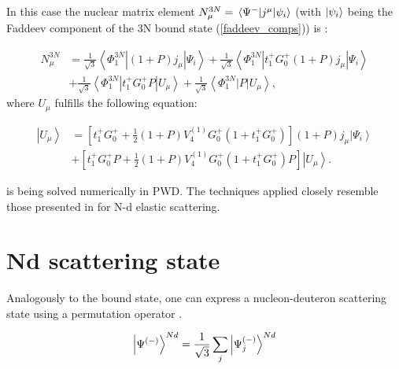     In this case the nuclear matrix element 
    $N_\mu^{3 N} = \matrixel{\Psi^-}{j^\mu}{\psi_i}$ 
    (with $\ket{\psi_i}$ being the Faddeev component of the 3N bound state (\ref{faddeev_comps})) is
    \cite{GLOCKLE_report_1996, skibinski_prc_2003} :

    \begin{equation}
        \begin{aligned}
            N_\mu^{3 N} & =\frac{1}{\sqrt{3}}\left\langle\Phi_1^{3 N}\left|(1+P) j_\mu\right| \Psi_i\right\rangle+\frac{1}{\sqrt{3}}\left\langle\Phi_1^{3 N}\left|t_1^{+} G_0^{+}(1+P) j_\mu\right| \Psi_i\right\rangle \\
            & +\frac{1}{\sqrt{3}}\left\langle\Phi_1^{3 N}\left|t_1^{+} G_0^{+} P\right| U_\mu\right\rangle+\frac{1}{\sqrt{3}}\left\langle\Phi_1^{3 N}|P| U_\mu\right\rangle,
            \end{aligned}
        \label{3n_matrix}
    \end{equation}
    where $ U_\mu$ fulfills the following equation:

    \begin{equation}
        \begin{aligned}
            \left|U_\mu\right\rangle & =\left[t_1^{+} G_0^{+}+\frac{1}{2}(1+P) V_4^{(1)} G_0^{+}\left(1+t_1^{+} G_0^{+}\right)\right](1+P) j_\mu\left|\Psi_i\right\rangle \\
            & +\left[t_1^{+} G_0^{+} P+\frac{1}{2}(1+P) V_4^{(1)} G_0^{+}\left(1+t_1^{+} G_0^{+}\right) P\right]\left|U_\mu\right\rangle.
            \end{aligned}
        \label{u_mu}
    \end{equation}

     is being solved numerically in PWD. The techniques applied closely resemble those presented in \cite{GLOCKLE_report_1996} for N-d elastic scattering.



\section{Nd scattering state}
\label{nd_state}

    Analogously to the bound state, one can express a nucleon-deuteron
    scattering state
    using a permutation operator .

    \begin{equation}
        \ket{\Psi^{(-)}}^{Nd} = \frac{1}{\sqrt{3}}\sum_j\ket{\Psi^{(-)}_j}^{Nd}    
    \end{equation}

